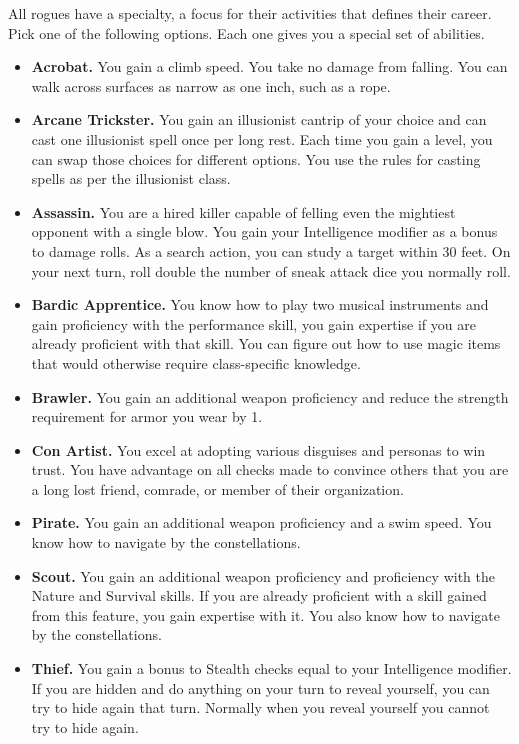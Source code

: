 \documentclass[12pt,letterpaper,twocolumn,openany,nodeprecatedcode,bg=none]{dndbook}
\providecommand{\tightlist}{%
  \setlength{\itemsep}{0pt}\setlength{\parskip}{0pt}}
\begin{document}
All rogues have a specialty, a focus for their activities that defines
their career. Pick one of the following options. Each one gives you a
special set of abilities.

\begin{itemize}
\tightlist
\item
  \textbf{Acrobat.} You gain a climb speed. You take no damage from
  falling. You can walk across surfaces as narrow as one inch, such as a
  rope.
\item
  \textbf{Arcane Trickster.} You gain an illusionist cantrip of your
  choice and can cast one illusionist spell once per long rest. Each
  time you gain a level, you can swap those choices for different
  options. You use the rules for casting spells as per the illusionist
  class.
\item
  \textbf{Assassin.} You are a hired killer capable of felling even the
  mightiest opponent with a single blow. You gain your Intelligence
  modifier as a bonus to damage rolls. As a search action, you can study
  a target within 30 feet. On your next turn, roll double the number of
  sneak attack dice you normally roll.
\item
  \textbf{Bardic Apprentice.} You know how to play two musical
  instruments and gain proficiency with the performance skill, you gain
  expertise if you are already proficient with that skill. You can
  figure out how to use magic items that would otherwise require
  class-specific knowledge.
\item
  \textbf{Brawler.} You gain an additional weapon proficiency and reduce
  the strength requirement for armor you wear by 1.
\item
  \textbf{Con Artist.} You excel at adopting various disguises and
  personas to win trust. You have advantage on all checks made to
  convince others that you are a long lost friend, comrade, or member of
  their organization.
\end{itemize}

\newpage

\begin{itemize}
\tightlist
\item
  \textbf{Pirate.} You gain an additional weapon proficiency and a swim
  speed. You know how to navigate by the constellations.
\item
  \textbf{Scout.} You gain an additional weapon proficiency and
  proficiency with the Nature and Survival skills. If you are already
  proficient with a skill gained from this feature, you gain expertise
  with it. You also know how to navigate by the constellations.
\item
  \textbf{Thief.} You gain a bonus to Stealth checks equal to your
  Intelligence modifier. If you are hidden and do anything on your turn
  to reveal yourself, you can try to hide again that turn. Normally when
  you reveal yourself you cannot try to hide again.
\end{itemize}
\end{document}
